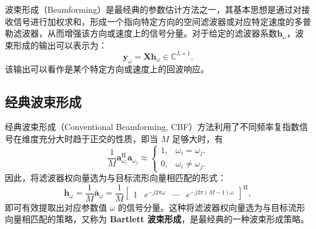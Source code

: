 波束形成（Beamforming）是最经典的参数估计方法之一，其基本思想是通过对接收信号进行加权求和，形成一个指向特定方向的空间滤波器或对应特定速度的多普勒滤波器，从而增强该方向或速度上的信号分量。对于给定的滤波器系数\( \bm{h}_{\omega} \)，波束形成的输出可以表示为：
\[
    \bm{y}_{\omega} = \mathbf{X} \bm{h}_{\omega} \in \mathbb{C}^{L \times 1}.
\]
该输出可以看作是某个特定方向或速度上的回波响应。

\subsection{经典波束形成}

经典波束形成（Conventional Beamforming, CBF）方法利用了不同频率复指数信号在维度充分大时趋于正交的性质，即当 $M$ 足够大时，有
\[
    \frac{1}{M}\bm{a}_{\omega_i}^{\mathrm{H}} \bm{a}_{\omega_j} \approx
    \begin{cases}
        1, & \omega_i = \omega_j.     \\
        0, & \omega_i \neq \omega_j .
    \end{cases}
\]
因此，将滤波器权向量选为与目标流形向量相匹配的形式：
\[
    \bm{h}_{\omega} = \frac{1}{M} \overline{\bm{a}}_\omega
    = \frac{1}{M} \begin{bmatrix}
        1 & e^{-j 2 \pi \omega} & \cdots & e^{-j 2 \pi (M-1) \omega}
    \end{bmatrix}^{\mathrm{H}},
\]
即可有效提取出对应参数值 $\omega$ 的信号分量。这种将滤波器权向量选为与目标流形向量相匹配的策略，又称为 \textbf{Bartlett 波束形成}，是最经典的一种波束形成策略。

